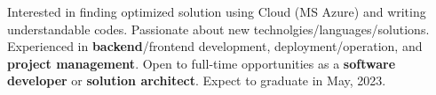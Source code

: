 

\begin{cvparagraph}

  Interested in finding optimized solution using Cloud (MS Azure) and writing understandable codes. Passionate about new technolgies/languages/solutions. Experienced in \textbf{backend}/frontend development, deployment/operation, and \textbf{project management}.
  Open to full-time opportunities as a \textbf{software developer} or \textbf{solution architect}. Expect to graduate in May, 2023.
\end{cvparagraph}
